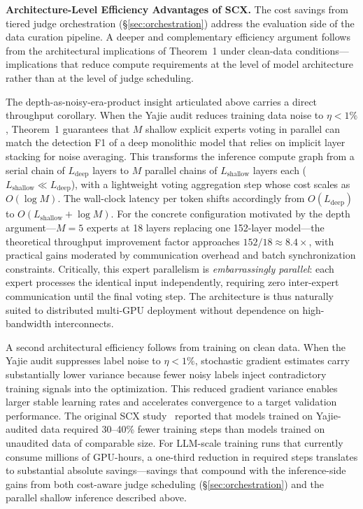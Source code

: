 \documentclass[11pt,twocolumn]{article}
\begin{document}
\textbf{Architecture-Level Efficiency Advantages of SCX.} The cost savings from tiered judge orchestration (\S\ref{sec:orchestration}) address the evaluation side of the data curation pipeline. A deeper and complementary efficiency argument follows from the architectural implications of Theorem~1 under clean-data conditions---implications that reduce compute requirements at the level of model architecture rather than at the level of judge scheduling.

The depth-as-noisy-era-product insight articulated above carries a direct throughput corollary. When the Yajie audit reduces training data noise to $\eta < 1\%$, Theorem~1 guarantees that $M$ shallow explicit experts voting in parallel can match the detection F1 of a deep monolithic model that relies on implicit layer stacking for noise averaging. This transforms the inference compute graph from a serial chain of $L_{\text{deep}}$ layers to $M$ parallel chains of $L_{\text{shallow}}$ layers each ($L_{\text{shallow}} \ll L_{\text{deep}}$), with a lightweight voting aggregation step whose cost scales as $O(\log M)$. The wall-clock latency per token shifts accordingly from $O(L_{\text{deep}})$ to $O(L_{\text{shallow}} + \log M)$. For the concrete configuration motivated by the depth argument---$M = 5$ experts at 18 layers replacing one 152-layer model---the theoretical throughput improvement factor approaches $152/18 \approx 8.4\times$, with practical gains moderated by communication overhead and batch synchronization constraints. Critically, this expert parallelism is \textit{embarrassingly parallel}: each expert processes the identical input independently, requiring zero inter-expert communication until the final voting step. The architecture is thus naturally suited to distributed multi-GPU deployment without dependence on high-bandwidth interconnects.

A second architectural efficiency follows from training on clean data. When the Yajie audit suppresses label noise to $\eta < 1\%$, stochastic gradient estimates carry substantially lower variance because fewer noisy labels inject contradictory training signals into the optimization. This reduced gradient variance enables larger stable learning rates and accelerates convergence to a target validation performance. The original SCX study~\cite{scx2026} reported that models trained on Yajie-audited data required 30--40\% fewer training steps than models trained on unaudited data of comparable size. For LLM-scale training runs that currently consume millions of GPU-hours, a one-third reduction in required steps translates to substantial absolute savings---savings that compound with the inference-side gains from both cost-aware judge scheduling (\S\ref{sec:orchestration}) and the parallel shallow inference described above.
\end{document}
